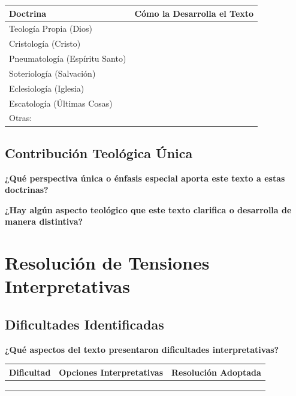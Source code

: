 \documentclass[11pt,a4paper]{article}
\begin{document}
\begin{tabularx}{\textwidth}{|X|X|}
\hline
\textbf{Doctrina} & \textbf{Cómo la Desarrolla el Texto} \\
\hline
Teología Propia (Dios) & \\[1.5cm]
\hline
Cristología (Cristo) & \\[1.5cm]
\hline
Pneumatología (Espíritu Santo) & \\[1.5cm]
\hline
Soteriología (Salvación) & \\[1.5cm]
\hline
Eclesiología (Iglesia) & \\[1.5cm]
\hline
Escatología (Últimas Cosas) & \\[1.5cm]
\hline
Otras: & \\[1.5cm]
\hline
\end{tabularx}

\subsection{Contribución Teológica Única}

\textbf{¿Qué perspectiva única o énfasis especial aporta este texto a estas doctrinas?}
\vspace{3cm}

\textbf{¿Hay algún aspecto teológico que este texto clarifica o desarrolla de manera distintiva?}
\vspace{3cm}

\newpage

\section{Resolución de Tensiones Interpretativas}

\subsection{Dificultades Identificadas}

\textbf{¿Qué aspectos del texto presentaron dificultades interpretativas?}

\begin{tabularx}{\textwidth}{|X|X|X|}
\hline
\textbf{Dificultad} & \textbf{Opciones Interpretativas} & \textbf{Resolución Adoptada} \\
\hline
& & \\[2cm]
\hline
& & \\[2cm]
\hline
& & \\[2cm]
\hline
\end{tabularx}
\end{document}
